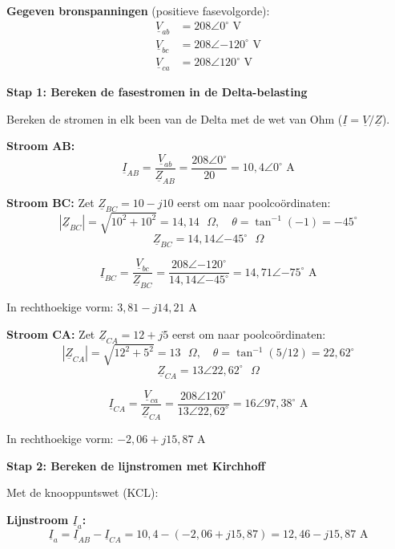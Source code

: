 \documentclass[a4paper,11pt]{article}
\begin{document}
\begin{oefenblok}

    \textbf{Gegeven bronspanningen} (positieve fasevolgorde):
    \begin{align*}
        \underline{V}_{ab} & = 208\angle{0^\circ} \text{ V}    \\
        \underline{V}_{bc} & = 208\angle{-120^\circ} \text{ V} \\
        \underline{V}_{ca} & = 208\angle{120^\circ} \text{ V}
    \end{align*}

    \textbf{Stap 1: Bereken de fasestromen in de Delta-belasting}

    Bereken de stromen in elk been van de Delta met de wet van Ohm ($\underline{I} = \underline{V}/\underline{Z}$).

    \textbf{Stroom AB:}
    \[\underline{I}_{AB} = \frac{\underline{V}_{ab}}{\underline{Z}_{AB}} = \frac{208\angle{0^\circ}}{20} = 10{,}4\angle{0^\circ} \text{ A}\]

    \textbf{Stroom BC:}
    Zet $\underline{Z}_{BC} = 10 - j10$ eerst om naar poolcoördinaten:
    \[|\underline{Z}_{BC}| = \sqrt{10^2 + 10^2} = 14{,}14 \text{ } \Omega, \quad \theta = \tan^{-1}(-1) = -45^\circ\]
    \[\underline{Z}_{BC} = 14{,}14\angle{-45^\circ} \text{ } \Omega\]

    \[\underline{I}_{BC} = \frac{\underline{V}_{bc}}{\underline{Z}_{BC}} = \frac{208\angle{-120^\circ}}{14{,}14\angle{-45^\circ}} = 14{,}71\angle{-75^\circ} \text{ A}\]


    In rechthoekige vorm: $3{,}81 - j14{,}21 \text{ A}$

    \textbf{Stroom CA:}
    Zet $\underline{Z}_{CA} = 12 + j5$ eerst om naar poolcoördinaten:
    \[|\underline{Z}_{CA}| = \sqrt{12^2 + 5^2} = 13 \text{ } \Omega, \quad \theta = \tan^{-1}(5/12) = 22{,}62^\circ\]
    \[\underline{Z}_{CA} = 13\angle{22{,}62^\circ} \text{ } \Omega\]

    \[\underline{I}_{CA} = \frac{\underline{V}_{ca}}{\underline{Z}_{CA}} = \frac{208\angle{120^\circ}}{13\angle{22{,}62^\circ}} = 16\angle{97{,}38^\circ} \text{ A}\]

    In rechthoekige vorm: $-2{,}06 + j15{,}87 \text{ A}$

    \textbf{Stap 2: Bereken de lijnstromen met Kirchhoff}

    Met de knooppuntswet (KCL):

    \textbf{Lijnstroom $\underline{I}_a$:}
    \[\underline{I}_a = \underline{I}_{AB} - \underline{I}_{CA} = 10{,}4 - (-2{,}06 + j15{,}87) = 12{,}46 - j15{,}87 \text{ A}\]


\end{oefenblok}
\end{document}

